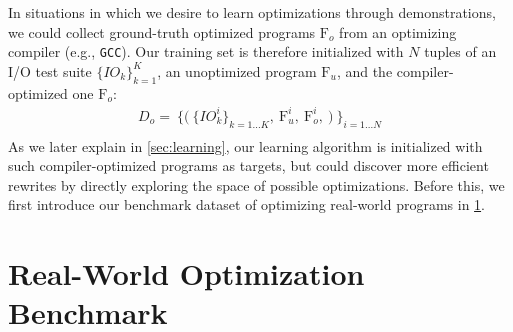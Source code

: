 \documentclass{article}
\newcommand\p{\ensuremath{{\mathrm{F}_u}}}
\newcommand\popt{\ensuremath{{\mathrm{F}_o}}}
\begin{document}
In situations in which we desire to learn optimizations through demonstrations, we could collect ground-truth optimized programs $\popt$ from an optimizing compiler (e.g., \texttt{GCC}).
Our training set is therefore initialized with $N$ tuples of an I/O test suite $\{IO_k\}_{k=1}^K$, an unoptimized program $\p$, and the compiler-optimized one $\popt$:
\begin{equation} 
    \begin{split}
    \label{eqn:init_dataset}
        D_o = \
                \bigg\{
                    \Big( \
                        \{IO_k^i\}_{k=1...K}, \
                        \textrm{F}_{u}^i, \
                        \textrm{F}_{o}^i, \
                    \Big) \
                \bigg\}_{i = 1...N} \\
    \end{split}
\end{equation}
As we later explain in \cref{sec:learning}, our learning algorithm is initialized with such  compiler-optimized programs as targets, but could discover more efficient rewrites by directly exploring the space of possible optimizations.
Before this, we first introduce our benchmark dataset of optimizing real-world programs in \cref{sec:benchmark}.

\section{Real-World Optimization Benchmark}
\label{sec:benchmark}
\end{document}
